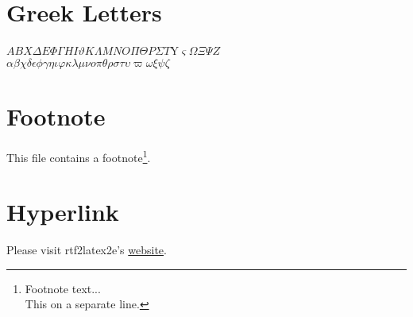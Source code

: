 \documentclass{article}
\begin{document}
\section*{Greek Letters}
\ensuremath{A}\ensuremath{B}\ensuremath{X}\ensuremath{\Delta}\ensuremath{E}\ensuremath{\Phi}\ensuremath{\Gamma}\ensuremath{H}\ensuremath{I}\ensuremath{\vartheta}\ensuremath{K}\ensuremath{\Lambda}\ensuremath{M}\ensuremath{N}\ensuremath{O}\ensuremath{\Pi}\ensuremath{\Theta}\ensuremath{P}\ensuremath{\Sigma}\ensuremath{T}Y\ensuremath{\varsigma}\ensuremath{\Omega}\ensuremath{\Xi}\ensuremath{\Psi}\ensuremath{Z}\\{}
\ensuremath{\alpha}\ensuremath{\beta}\ensuremath{\chi}\ensuremath{\delta}\ensuremath{\epsilon}\ensuremath{\phi}\ensuremath{\gamma}\ensuremath{\eta}\ensuremath{\iota}\ensuremath{\varphi}\ensuremath{\kappa}\ensuremath{\lambda}\ensuremath{\mu}\ensuremath{\nu}\ensuremath{o}\ensuremath{\pi}\ensuremath{\theta}\ensuremath{\rho}\ensuremath{\sigma}\ensuremath{\tau}\ensuremath{\upsilon}\ensuremath{\varpi}\ensuremath{\omega}\ensuremath{\xi}\ensuremath{\psi}\ensuremath{\zeta}



\section*{Footnote}
This file contains a footnote\footnote{Footnote text... \\{}
This on a separate line.}.



\section*{Hyperlink}
Please visit rtf2latex2e's {\underline {website}}.
\end{document}
